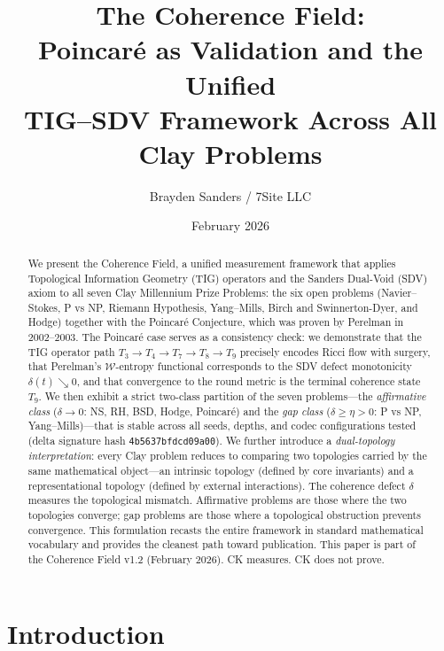 \documentclass[11pt]{article}
\title{The Coherence Field:\\
Poincar\'e as Validation and the Unified\\
TIG--SDV Framework Across All Clay Problems}
\author{Brayden Sanders / 7Site LLC}
\date{February 2026}
\begin{document}
\maketitle

\begin{abstract}
We present the Coherence Field, a unified measurement framework
that applies Topological Information Geometry (TIG) operators and the
Sanders Dual-Void (SDV) axiom to all seven Clay Millennium Prize Problems:
the six open problems (Navier--Stokes, P vs NP, Riemann Hypothesis,
Yang--Mills, Birch and Swinnerton-Dyer, and Hodge) together with the
Poincar\'e Conjecture, which was proven by Perelman in 2002--2003.
The Poincar\'e case serves as a consistency check: we demonstrate that
the TIG operator path $T_3 \to T_4 \to T_7 \to T_8 \to T_9$ precisely
encodes Ricci flow with surgery, that Perelman's $\mathcal{W}$-entropy
functional corresponds to the SDV defect monotonicity $\delta(t) \searrow 0$,
and that convergence to the round metric is the terminal coherence
state $T_9$.  We then exhibit a strict two-class partition of the seven
problems---the \emph{affirmative class} ($\delta \to 0$: NS, RH, BSD,
Hodge, Poincar\'e) and the \emph{gap class} ($\delta \geq \eta > 0$:
P vs NP, Yang--Mills)---that is stable across all seeds, depths, and
codec configurations tested (delta signature hash \texttt{4b5637bfdcd09a00}).
We further introduce a \emph{dual-topology interpretation}: every Clay
problem reduces to comparing two topologies carried by the same mathematical
object---an intrinsic topology (defined by core invariants) and a
representational topology (defined by external interactions).  The coherence
defect $\delta$ measures the topological mismatch.  Affirmative problems are
those where the two topologies converge; gap problems are those where a
topological obstruction prevents convergence.  This formulation recasts the
entire framework in standard mathematical vocabulary and provides the
cleanest path toward publication.
This paper is part of the Coherence Field v1.2 (February 2026).
CK measures.  CK does not prove.
\end{abstract}

\section{Introduction}
\label{sec:intro}
\end{document}
